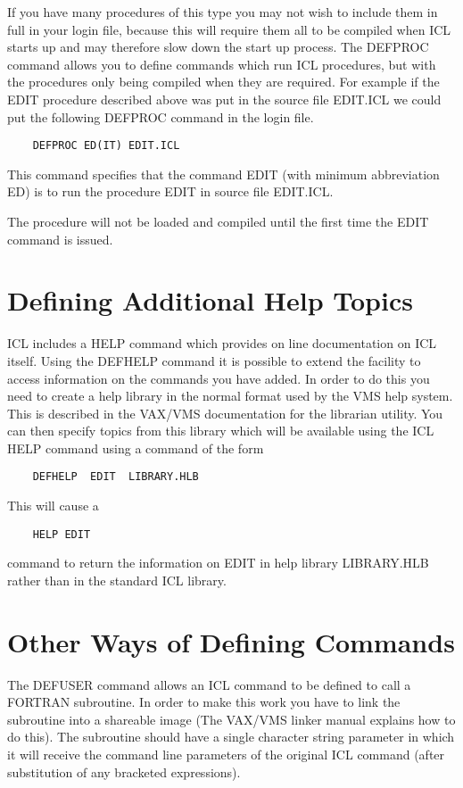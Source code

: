 \documentclass[twoside,11pt]{report}
\newcommand{\xlabel}[1]{}
\begin{document}
If you have many procedures of this type you may not wish to include them
in full in your login file, because this will require them all to be compiled
when ICL starts up and may therefore slow down the start up process. The
DEFPROC command allows you to define commands which run ICL procedures,
but with the procedures only being compiled when they are required. For
example if the EDIT procedure described above was put in the source file
EDIT.ICL we could put the following DEFPROC command in the login file.

\begin{verbatim}
    DEFPROC ED(IT) EDIT.ICL
\end{verbatim}

This command specifies that the command EDIT (with minimum abbreviation
ED) is to run the procedure EDIT in source file EDIT.ICL. 
                   
The procedure will not be loaded and compiled until the first time the
EDIT command is issued.
    
\section{\xlabel{defining_additional_help_topics}Defining Additional Help Topics}

ICL includes a HELP command which provides on line documentation on ICL
itself. Using the DEFHELP command it is possible to extend the facility
to access information on the commands you have added. In order to do this
you need to create a help library in the normal format used by the VMS
help system. This is described in the VAX/VMS documentation for the librarian
utility. You can then specify topics from this library which will be
available using the ICL HELP command using a command of the form
\begin{verbatim}
    DEFHELP  EDIT  LIBRARY.HLB
\end{verbatim}
This will cause a
\begin{verbatim}
    HELP EDIT
\end{verbatim}
command to return the information on EDIT in help library LIBRARY.HLB rather
than in the standard ICL library.

\section{\xlabel{other_ways_of_defining_commands}Other Ways of Defining Commands}

The DEFUSER command allows an ICL command to be defined to call a FORTRAN
subroutine. In order to make this work you have to link the subroutine into
a shareable image (The VAX/VMS linker manual explains how to do this). The
subroutine should have a single character string parameter in which it will
receive the command line parameters of the original ICL command (after
substitution of any bracketed expressions).
\end{document}
